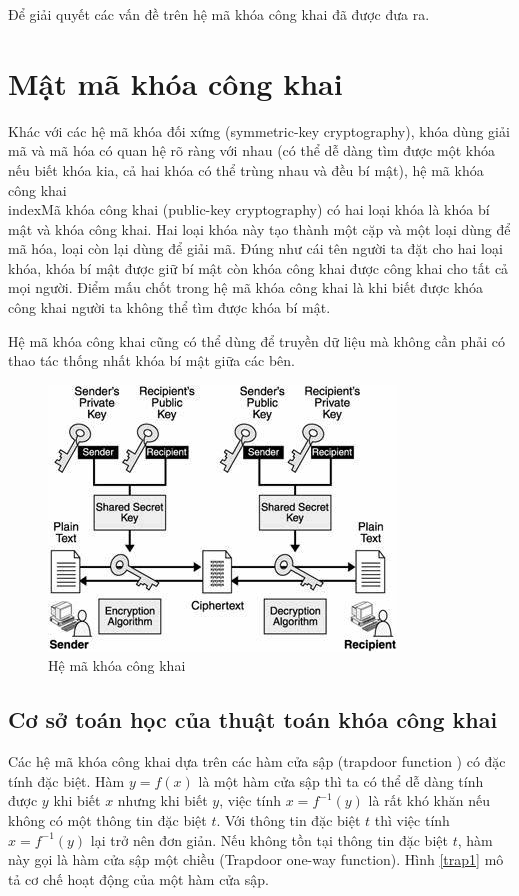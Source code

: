 \documentclass[a4paper,12pt]{report}
\begin{document}
Để giải quyết các vấn đề trên hệ mã khóa công khai đã được đưa ra.
\section{Mật mã khóa công khai}
Khác với các hệ mã khóa đối xứng  (symmetric-key cryptography), khóa dùng giải mã và mã hóa có quan hệ rõ ràng với nhau (có thể dễ dàng tìm được một khóa nếu biết khóa kia, cả hai khóa có thể trùng nhau và đều bí mật), hệ mã khóa công khai \\index{Mã khóa công khai} (public-key cryptography) có hai loại khóa là khóa bí mật và khóa công khai. Hai loại khóa này tạo thành một cặp và một loại dùng để mã hóa, loại còn lại dùng để giải mã. Đúng như cái tên người ta đặt cho hai loại khóa, khóa bí mật được giữ bí mật còn khóa công khai được công khai cho tất cả mọi người. Điểm mấu chốt trong hệ mã khóa công khai là khi biết được khóa công khai người ta không thể tìm được khóa bí mật.

Hệ mã khóa công khai cũng có thể dùng để truyền dữ liệu mà không cần phải có thao tác thống nhất khóa bí mật giữa các bên.

\begin{center}
\begin{figure}
\centering
\includegraphics[width=0.6\linewidth]{../3.jpg}
\caption{Hệ mã khóa công khai}
\end{figure}
\end{center}

\subsection*{Cơ sở toán học của thuật toán khóa công khai}
Các hệ mã khóa công khai dựa trên các hàm cửa sập (trapdoor function ) có đặc tính đặc biệt. Hàm $y = f(x)$ là một hàm cửa sập thì ta có thể dễ dàng tính được $y$ khi biết $x$ nhưng khi biết $y$, việc tính $x = f^{-1}(y)$ là rất khó khăn nếu không có một thông tin đặc biệt $t$. Với thông tin đặc biệt $t$ thì việc tính $x = f^{-1}(y)$ lại trở nên đơn giản. Nếu không tồn tại thông tin đặc biệt $t$, hàm này gọi là hàm cửa sập một chiều (Trapdoor one-way function). Hình \ref{trap1} mô tả cơ chế hoạt động của một hàm cửa sập.
\end{document}
